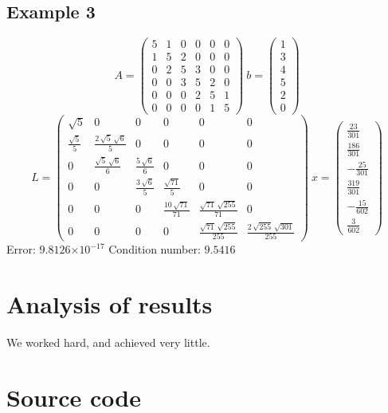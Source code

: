 \documentclass[12pt]{article}
\providecommand{\e}[1]{\ensuremath{\times 10^{#1}}}
\begin{document}
\subsection{Example 3}
$$A=\left(\begin{array}{cccccc} 5 & 1 & 0 & 0 & 0 & 0\\ 1 & 5 & 2 & 0 & 0 & 0\\ 0 & 2 & 5 & 3 & 0 & 0\\ 0 & 0 & 3 & 5 & 2 & 0\\ 0 & 0 & 0 & 2 & 5 & 1\\ 0 & 0 & 0 & 0 & 1 & 5 \end{array}\right)\
b=\left(\begin{array}{c} 1\\ 3\\ 4\\ 5\\ 2\\ 0 \end{array}\right)
$$
$$
L=\left(\begin{array}{cccccc} \sqrt{5} & 0 & 0 & 0 & 0 & 0\\ \frac{\sqrt{5}}{5} & \frac{2\,\sqrt{5}\,\sqrt{6}}{5} & 0 & 0 & 0 & 0\\ 0 & \frac{\sqrt{5}\,\sqrt{6}}{6} & \frac{5\,\sqrt{6}}{6} & 0 & 0 & 0\\ 0 & 0 & \frac{3\,\sqrt{6}}{5} & \frac{\sqrt{71}}{5} & 0 & 0\\ 0 & 0 & 0 & \frac{10\,\sqrt{71}}{71} & \frac{\sqrt{71}\,\sqrt{255}}{71} & 0\\ 0 & 0 & 0 & 0 & \frac{\sqrt{71}\,\sqrt{255}}{255} & \frac{2\,\sqrt{255}\,\sqrt{301}}{255} \end{array}\right)\
x=\left(\begin{array}{c} \frac{23}{301}\\ \frac{186}{301}\\ -\frac{25}{301}\\ \frac{319}{301}\\ -\frac{15}{602}\\ \frac{3}{602} \end{array}\right)
$$
Error: $9.8126\e{-17}$ Condition number: $9.5416$

\section{Analysis of results}
We worked hard, and achieved very little.

\section{Source code}
\end{document}

